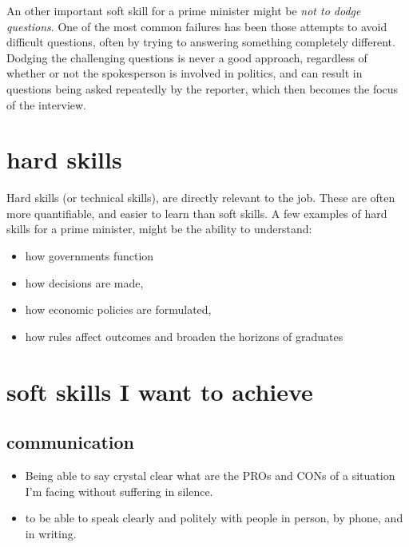\documentclass[a4paper,12pt]{article}
\begin{document}
An other important soft skill for a prime minister might be \emph{not to dodge questions}.
One of the most common failures has been those attempts to avoid difficult questions, often by trying to answering something completely different.
Dodging the challenging questions is never a good approach, regardless of whether or not the spokesperson is involved in politics, and can result in questions being asked repeatedly by the reporter, which then becomes the focus of the interview.

\clearpage

\section{hard skills}
Hard skills (or technical skills), are directly relevant to the job. These are often more quantifiable, and easier to learn than soft skills.
A few examples of hard skills for a prime minister, might be the ability to understand:

\begin{itemize}

\item  how governments function 
\item  how decisions are made,
\item  how economic policies are formulated,
\item  how rules affect outcomes and broaden the horizons of graduates

\end{itemize}



\section{soft skills I want to achieve}

\subsection{communication}

\begin{itemize}
\item Being able to say crystal clear what are the PROs and CONs of a situation I'm facing without suffering in silence.
\item to be able to speak clearly and politely with people in person, by phone, and in writing.
\end{itemize}
\end{document}
